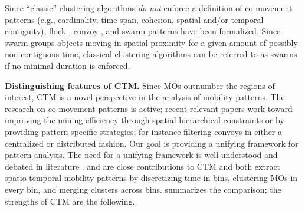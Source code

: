 \documentclass[preprint,12pt,authoryear]{elsarticle} %
\begin{document}
Since ``classic'' clustering algorithms \textit{do not} enforce a definition of co-movement patterns (e.g., cardinality, time span, cohesion, spatial and/or temporal contiguity), flock \citep{DBLP:conf/gis/GudmundssonK06}, convoy \citep{DBLP:journals/pvldb/JeungYZJS08}, and swarm \citep{DBLP:conf/ssdbm/AungT10} patterns have been formalized.
Since swarm \citep{DBLP:conf/ssdbm/AungT10} groups objects moving in spatial proximity for a given amount of possibly-non-contiguous time,
classical clustering algorithms can be referred to as swarms if no minimal duration is enforced.

\textbf{Distinguishing features of CTM.}
Since MOs outnumber the regions of interest, CTM is a novel perspective in the analysis of mobility patterns.
The research on co-movement patterns is active;
recent relevant papers work toward improving the mining efficiency through spatial hierarchical constraints \citep{helmi2020multiscale} or by providing pattern-specific strategies; for instance filtering convoys in either a centralized \citep{DBLP:conf/ssdbm/AungT10,DBLP:journals/pvldb/OrakzaiCP19,DBLP:conf/cikm/Liu0LLYW21} or distributed \citep{DBLP:journals/geoinformatica/OrakzaiPC21,tritsarolis2022predicting} fashion.
Our goal is providing a unifying framework for pattern analysis.
The need for a unifying framework is well-understood and debated in literature \citep{DBLP:journals/pvldb/DingCGJB18,DBLP:journals/jdwm/Kwakye20}.
\cite{DBLP:journals/ijitdm/PhanPT16} and \cite{DBLP:journals/pvldb/FanZWT16} are close contributions to CTM and both extract spatio-temporal mobility patterns by discretizing time in bins, clustering MOs in every bin, and merging clusters across bins.
 summarizes the comparison; the strengths of CTM are the following.
\end{document}
